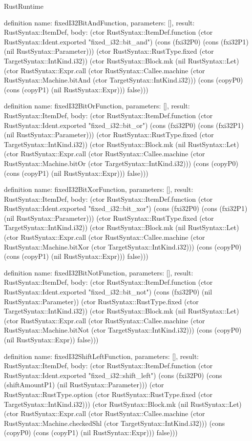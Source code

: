 \begin{lexlean}{RustRuntime}
\begin{semanticmodule}
definition{
  name: fixedI32BitAndFunction,
  parameters: [],
  result: RustSyntax::ItemDef,
  body: (ctor RustSyntax::ItemDef.function (ctor RustSyntax::Ident.exported "fixed_i32::bit_and") (cons (fxi32P0) (cons (fxi32P1) (nil RustSyntax::Parameter))) (ctor RustSyntax::RustType.fixed (ctor TargetSyntax::IntKind.i32)) (ctor RustSyntax::Block.mk (nil RustSyntax::Let) (ctor RustSyntax::Expr.call (ctor RustSyntax::Callee.machine (ctor RustSyntax::Machine.bitAnd (ctor TargetSyntax::IntKind.i32))) (cons (copyP0) (cons (copyP1) (nil RustSyntax::Expr))) false)))
}

definition{
  name: fixedI32BitOrFunction,
  parameters: [],
  result: RustSyntax::ItemDef,
  body: (ctor RustSyntax::ItemDef.function (ctor RustSyntax::Ident.exported "fixed_i32::bit_or") (cons (fxi32P0) (cons (fxi32P1) (nil RustSyntax::Parameter))) (ctor RustSyntax::RustType.fixed (ctor TargetSyntax::IntKind.i32)) (ctor RustSyntax::Block.mk (nil RustSyntax::Let) (ctor RustSyntax::Expr.call (ctor RustSyntax::Callee.machine (ctor RustSyntax::Machine.bitOr (ctor TargetSyntax::IntKind.i32))) (cons (copyP0) (cons (copyP1) (nil RustSyntax::Expr))) false)))
}

definition{
  name: fixedI32BitXorFunction,
  parameters: [],
  result: RustSyntax::ItemDef,
  body: (ctor RustSyntax::ItemDef.function (ctor RustSyntax::Ident.exported "fixed_i32::bit_xor") (cons (fxi32P0) (cons (fxi32P1) (nil RustSyntax::Parameter))) (ctor RustSyntax::RustType.fixed (ctor TargetSyntax::IntKind.i32)) (ctor RustSyntax::Block.mk (nil RustSyntax::Let) (ctor RustSyntax::Expr.call (ctor RustSyntax::Callee.machine (ctor RustSyntax::Machine.bitXor (ctor TargetSyntax::IntKind.i32))) (cons (copyP0) (cons (copyP1) (nil RustSyntax::Expr))) false)))
}

definition{
  name: fixedI32BitNotFunction,
  parameters: [],
  result: RustSyntax::ItemDef,
  body: (ctor RustSyntax::ItemDef.function (ctor RustSyntax::Ident.exported "fixed_i32::bit_not") (cons (fxi32P0) (nil RustSyntax::Parameter)) (ctor RustSyntax::RustType.fixed (ctor TargetSyntax::IntKind.i32)) (ctor RustSyntax::Block.mk (nil RustSyntax::Let) (ctor RustSyntax::Expr.call (ctor RustSyntax::Callee.machine (ctor RustSyntax::Machine.bitNot (ctor TargetSyntax::IntKind.i32))) (cons (copyP0) (nil RustSyntax::Expr)) false)))
}

definition{
  name: fixedI32ShiftLeftFunction,
  parameters: [],
  result: RustSyntax::ItemDef,
  body: (ctor RustSyntax::ItemDef.function (ctor RustSyntax::Ident.exported "fixed_i32::shift_left") (cons (fxi32P0) (cons (shiftAmountP1) (nil RustSyntax::Parameter))) (ctor RustSyntax::RustType.option (ctor RustSyntax::RustType.fixed (ctor TargetSyntax::IntKind.i32))) (ctor RustSyntax::Block.mk (nil RustSyntax::Let) (ctor RustSyntax::Expr.call (ctor RustSyntax::Callee.machine (ctor RustSyntax::Machine.checkedShl (ctor TargetSyntax::IntKind.i32))) (cons (copyP0) (cons (copyP1) (nil RustSyntax::Expr))) false)))
}


\end{semanticmodule}
\end{lexlean}

